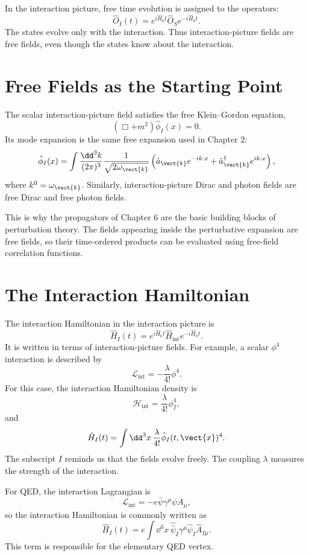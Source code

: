 In the interaction picture, free time evolution is assigned to the operators:
\[
    \hat O_I(t)
    = e^{i\hat H_0 t}\hat O_S e^{-i\hat H_0 t}.
\]
The states evolve only with the interaction. Thus interaction-picture fields are
free fields, even though the states know about the interaction.

\section{Free Fields as the Starting Point}

The scalar interaction-picture field satisfies the free Klein--Gordon equation,
\[
    (\Box+m^2)\hat\phi_I(x)=0.
\]
Its mode expansion is the same free expansion used in Chapter 2:
\[
    \hat\phi_I(x)
    = \int\frac{\dd^3k}{(2\pi)^3}\frac{1}{\sqrt{2\omega_{\vect{k}}}}
      \left(
          \hat a_{\vect{k}}e^{-ik\cdot x}
          +\hat a_{\vect{k}}^\dagger e^{ik\cdot x}
      \right),
\]
where \(k^0=\omega_{\vect{k}}\). Similarly, interaction-picture Dirac and
photon fields are free Dirac and free photon fields.

This is why the propagators of Chapter 6 are the basic building blocks of
perturbation theory. The fields appearing inside the perturbative expansion are
free fields, so their time-ordered products can be evaluated using free-field
correlation functions.

\section{The Interaction Hamiltonian}

The interaction Hamiltonian in the interaction picture is
\[
    \hat H_I(t)
    = e^{i\hat H_0 t}\hat H_{\mathrm{int}}e^{-i\hat H_0 t}.
\]
It is written in terms of interaction-picture fields. For example, a scalar
\(\phi^4\) interaction is described by
\[
    \mathcal{L}_{\mathrm{int}}
    = -\frac{\lambda}{4!}\phi^4.
\]
For this case, the interaction Hamiltonian density is
\[
    \mathcal{H}_{\mathrm{int}}
    = \frac{\lambda}{4!}\phi_I^4,
\]
and
\[
    \hat H_I(t)
    = \int\dd^3x\,\frac{\lambda}{4!}\hat\phi_I(t,\vect{x})^4.
\]
The subscript \(I\) reminds us that the fields evolve freely. The coupling
\(\lambda\) measures the strength of the interaction.

For QED, the interaction Lagrangian is
\[
    \mathcal{L}_{\mathrm{int}}
    = -e\bar\psi\gamma^\mu\psi A_\mu,
\]
so the interaction Hamiltonian is commonly written as
\[
    \hat H_I(t)
    = e\int\dd^3x\,
      \hat{\bar\psi}_I\gamma^\mu\hat\psi_I\hat A_{I\mu}.
\]
This term is responsible for the elementary QED vertex.


